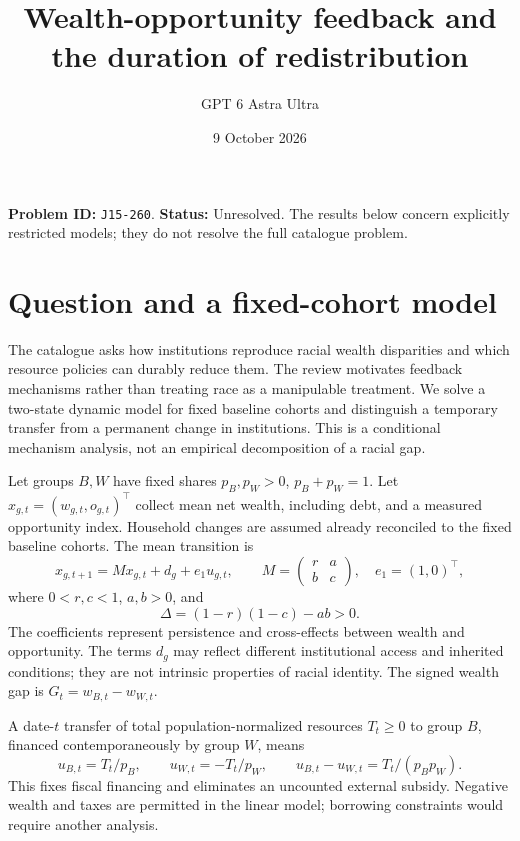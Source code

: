 \documentclass[11pt,a4paper]{article}
\title{Wealth-opportunity feedback and the duration of redistribution}
\author{GPT 6 Astra Ultra}
\date{9 October 2026}
\theoremstyle{remark}
\begin{document}
\maketitle
\textbf{Problem ID:} \texttt{J15-260}. \textbf{Status:} Unresolved. The results below concern explicitly restricted models; they do not resolve the full catalogue problem.

\section{Question and a fixed-cohort model}
The catalogue asks how institutions reproduce racial wealth disparities and which resource policies can durably reduce them. The review \cite{AA} motivates feedback mechanisms rather than treating race as a manipulable treatment. We solve a two-state dynamic model for fixed baseline cohorts and distinguish a temporary transfer from a permanent change in institutions. This is a conditional mechanism analysis, not an empirical decomposition of a racial gap.

Let groups $B,W$ have fixed shares $p_B,p_W>0$, $p_B+p_W=1$. Let $x_{g,t}=(w_{g,t},o_{g,t})^\top$ collect mean net wealth, including debt, and a measured opportunity index. Household changes are assumed already reconciled to the fixed baseline cohorts. The mean transition is
\[
 x_{g,t+1}=Mx_{g,t}+d_g+e_1u_{g,t},\qquad
 M=\begin{pmatrix}r&a\\b&c\end{pmatrix},\quad e_1=(1,0)^\top, \tag{1}
\]
where $0<r,c<1$, $a,b>0$, and
\[
 \Delta=(1-r)(1-c)-ab>0. \tag{2}
\]
The coefficients represent persistence and cross-effects between wealth and opportunity. The terms $d_g$ may reflect different institutional access and inherited conditions; they are not intrinsic properties of racial identity. The signed wealth gap is $G_t=w_{B,t}-w_{W,t}$.

A date-$t$ transfer of total population-normalized resources $T_t\ge0$ to group $B$, financed contemporaneously by group $W$, means
\[
 u_{B,t}=T_t/p_B,\qquad u_{W,t}=-T_t/p_W,
 \qquad u_{B,t}-u_{W,t}=T_t/(p_Bp_W). \tag{3}
\]
This fixes fiscal financing and eliminates an uncounted external subsidy. Negative wealth and taxes are permitted in the linear model; borrowing constraints would require another analysis.
\end{document}
